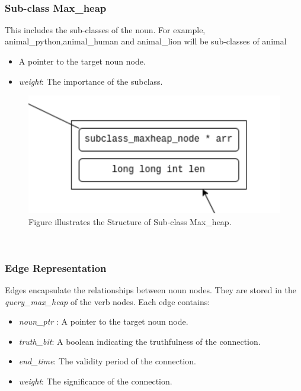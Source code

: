 \documentclass[conference]{IEEEtran}
\begin{document}
\\

\subsubsection{Sub-class Max\_heap}
This includes the sub-classes of the noun. For example, animal\_python,animal\_human and animal\_lion will be sub-classes of animal  
\begin{itemize}
    \item A pointer to the target noun node.
    \item \textit{weight}: The importance of the subclass.
\end{itemize}

\begin{figure}[htbp]
\centering
\includegraphics[width=0.8\linewidth]{subclass_maxheap.png} %
\caption{Figure illustrates the Structure of Sub-class Max\_heap.}
\label{fig}
\end{figure}

\\

\subsubsection{Edge Representation}
Edges encapsulate the relationships between noun nodes. They are stored in the \textit{query\_max\_heap} of the verb nodes. Each edge contains:
\begin{itemize}

    \item \textit{noun\_ptr} : A pointer to the target noun node.
    \item \textit{truth\_bit}: A boolean indicating the truthfulness of the connection.
    \item \textit{end\_time}: The validity period of the connection.
    \item \textit{weight}: The significance of the connection.
\end{itemize}
\end{document}
